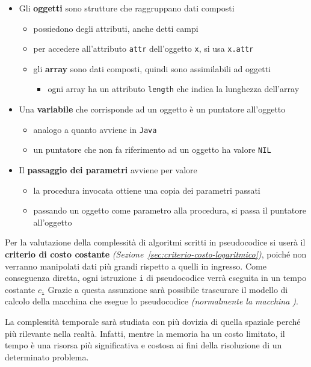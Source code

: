 \documentclass[italian, 10pt]{article}
\begin{document}
\begin{itemize}
  \item Gli \textbf{oggetti} sono strutture che raggruppano dati composti
        \begin{itemize}
          \item possiedono degli attributi, anche detti campi
          \item per accedere all'attributo \texttt{attr} dell'oggetto \texttt{x}, si usa \texttt{x.attr}
          \item gli \textbf{array} sono dati composti, quindi sono assimilabili ad oggetti
                \begin{itemize}[label=\(\rightarrow\)]
                  \item ogni array ha un attributo \texttt{length} che indica la lunghezza dell'array
                \end{itemize}
        \end{itemize}
  \item Una \textbf{variabile} che corrisponde ad un oggetto è un puntatore all'oggetto
        \begin{itemize}
          \item analogo a quanto avviene in \texttt{Java}
          \item un puntatore che non fa riferimento ad un oggetto ha valore \texttt{NIL}
        \end{itemize}
  \item Il \textbf{passaggio dei parametri} avviene per valore
        \begin{itemize}
          \item la procedura invocata ottiene una copia dei parametri passati
          \item passando un oggetto come parametro alla procedura, si passa il puntatore all'oggetto
        \end{itemize}
\end{itemize}

\bigskip
Per la valutazione della complessità di algoritmi scritti in pseudocodice si userà il \textbf{criterio di costo costante} \textit{(Sezione~\ref{sec:criterio-costo-logaritmico})}, poiché non verranno manipolati dati più grandi rispetto a quelli in ingresso.
Come conseguenza diretta, ogni istruzione \texttt{i} di pseudocodice verrà eseguita in un tempo costante \(c_\texttt{i}\)
Grazie a questa assunzione sarà possibile trascurare il modello di calcolo della macchina che esegue lo pseudocodice \textit{(normalmente la macchina \RAM)}.

La complessità temporale sarà studiata con più dovizia di quella spaziale perché più rilevante nella realtà.
Infatti, mentre la memoria ha un costo limitato, il tempo è una risorsa più significativa e costosa ai fini della risoluzione di un determinato problema.
\end{document}
